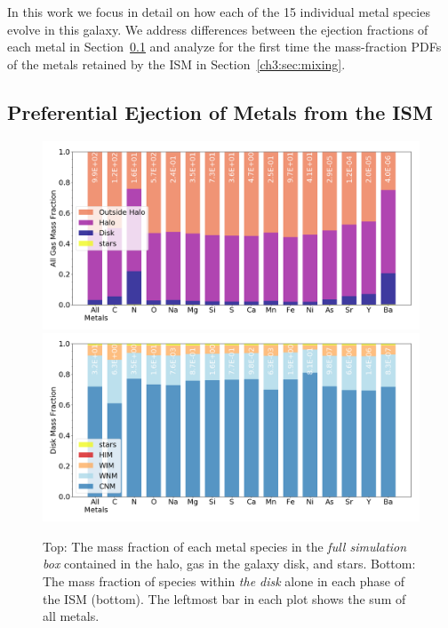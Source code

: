 In this work we focus in detail on how each of the 15 individual metal species evolve in this galaxy. We address differences between the ejection fractions of each metal in Section~\ref{ch3:sec:ejection} and analyze for the first time the mass-fraction PDFs of the metals retained by the ISM in Section~\ref{ch3:sec:mixing}.

\subsection{Preferential Ejection of Metals from the ISM}
\label{ch3:sec:ejection}

\begin{figure}
\centering
\includegraphics[width=0.99\linewidth]{figures/ch3/species_bar}\\
\includegraphics[width=0.99\linewidth]{figures/ch3/species_bar_ISM}
\caption{Top: The mass fraction of each metal species in the \textit{full simulation box} contained in the halo, gas in the galaxy disk, and stars. Bottom: The mass fraction of species within \textit{the disk} alone in each phase of the ISM (bottom). The leftmost bar in each plot shows the sum of all metals.}
\label{ch3:fig:species_fractions}
\end{figure}

